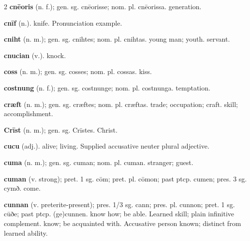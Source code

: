 \begin{multicols*}{2}
\textbf{cnēoris} (n. f.); gen. sg. cnēorisse; nom. pl. cnēorissa. generation.\par
\textbf{cnīf} (n.). knife. Pronunciation example.\par
\textbf{cniht} (n. m.); gen. sg. cnihtes; nom. pl. cnihtas. young man; youth. servant.\par
\textbf{cnucian} (v.). knock.\par
\textbf{coss} (n. m.); gen. sg. cosses; nom. pl. cossas. kiss.\par
\textbf{costnung} (n. f.); gen. sg. costnunge; nom. pl. costnunga. temptation.\par
\textbf{cræft} (n. m.); gen. sg. cræftes; nom. pl. cræftas. trade; occupation; craft. skill; accomplishment.\par
\textbf{Crīst} (n. m.); gen. sg. Crīstes. Christ.\par
\textbf{cucu} (adj.). alive; living. Supplied accusative neuter plural adjective.\par
\textbf{cuma} (n. m.); gen. sg. cuman; nom. pl. cuman. stranger; guest.\par
\textbf{cuman} (v. strong); pret. 1 sg. cōm; pret. pl. cōmon; past ptcp. cumen; pres. 3 sg. cymð. come.\par
\textbf{cunnan} (v. preterite-present); pres. 1/3 sg. cann; pres. pl. cunnon; pret. 1 sg. cūðe; past ptcp. (ge)cunnen. know how; be able. Learned skill; plain infinitive complement. know; be acquainted with. Accusative person known; distinct from learned ability.\par

\end{multicols*}

